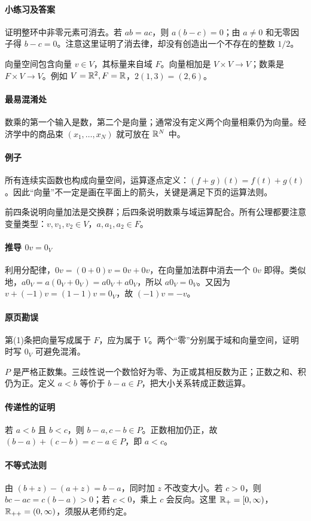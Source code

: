 \paragraph{小练习及答案}证明整环中非零元素可消去。若 $ab=ac$，则 $a(b-c)=0$；由 $a\ne0$ 和无零因子得 $b-c=0$。注意这里证明了消去律，却没有创造出一个不存在的整数 $1/2$。

向量空间包含向量 $v\in V$，其标量来自域 $F$。向量相加是 $V\times V\to V$；数乘是 $F\times V\to V$。例如 $V=\mathbb{R}^2,F=\mathbb{R}$，$2(1,3)=(2,6)$。
\paragraph{最易混淆处}数乘的第一个输入是数，第二个是向量；通常没有定义两个向量相乘仍为向量。经济学中的商品束 $(x_1,\ldots,x_N)$ 就可放在 $\mathbb{R}^N$ 中。
\paragraph{例子}所有连续实函数也构成向量空间，运算逐点定义：$(f+g)(t)=f(t)+g(t)$。因此“向量”不一定是画在平面上的箭头，关键是满足下页的运算法则。

前四条说明向量加法是交换群；后四条说明数乘与域运算配合。所有公理都要注意变量类型：$v,v_1,v_2\in V$，$a,a_1,a_2\in F$。
\paragraph{推导 $0v=0_V$}利用分配律，$0v=(0+0)v=0v+0v$，在向量加法群中消去一个 $0v$ 即得。类似地，$a0_V=a(0_V+0_V)=a0_V+a0_V$，所以 $a0_V=0_V$。又因为 $v+(-1)v=(1-1)v=0_V$，故 $(-1)v=-v$。
\paragraph{原页勘误}第(1)条把向量写成属于 $F$，应为属于 $V$。两个“零”分别属于域和向量空间，证明时写 $0_V$ 可避免混淆。

$P$ 是严格正数集。三歧性说一个数恰好为零、为正或其相反数为正；正数之和、积仍为正。定义 $a<b$ 等价于 $b-a\in P$，把大小关系转成正数运算。
\paragraph{传递性的证明}若 $a<b$ 且 $b<c$，则 $b-a,c-b\in P$。正数相加仍正，故 $(b-a)+(c-b)=c-a\in P$，即 $a<c$。
\paragraph{不等式法则}由 $(b+z)-(a+z)=b-a$，同时加 $z$ 不改变大小。若 $c>0$，则 $bc-ac=c(b-a)>0$；若 $c<0$，乘上 $c$ 会反向。这里 $\mathbb{R}_+=[0,\infty)$，$\mathbb{R}_{++}=(0,\infty)$，须服从老师约定。

